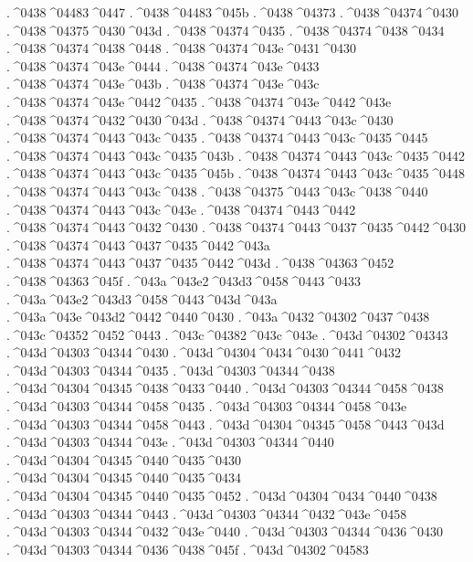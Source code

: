 {.^^^^0438^^^^04483^^^^0447
.^^^^0438^^^^04483^^^^045b
.^^^^0438^^^^04373
.^^^^0438^^^^04374^^^^0430
.^^^^0438^^^^04375^^^^0430^^^^043d
.^^^^0438^^^^04374^^^^0435
.^^^^0438^^^^04374^^^^0438^^^^0434
.^^^^0438^^^^04374^^^^0438^^^^0448
.^^^^0438^^^^04374^^^^043e^^^^0431^^^^0430
.^^^^0438^^^^04374^^^^043e^^^^0444
.^^^^0438^^^^04374^^^^043e^^^^0433
.^^^^0438^^^^04374^^^^043e^^^^043b
.^^^^0438^^^^04374^^^^043e^^^^043c
.^^^^0438^^^^04374^^^^043e^^^^0442^^^^0435
.^^^^0438^^^^04374^^^^043e^^^^0442^^^^043e
.^^^^0438^^^^04374^^^^0432^^^^0430^^^^043d
.^^^^0438^^^^04374^^^^0443^^^^043c^^^^0430
.^^^^0438^^^^04374^^^^0443^^^^043c^^^^0435
.^^^^0438^^^^04374^^^^0443^^^^043c^^^^0435^^^^0445
.^^^^0438^^^^04374^^^^0443^^^^043c^^^^0435^^^^043b
.^^^^0438^^^^04374^^^^0443^^^^043c^^^^0435^^^^0442
.^^^^0438^^^^04374^^^^0443^^^^043c^^^^0435^^^^045b
.^^^^0438^^^^04374^^^^0443^^^^043c^^^^0435^^^^0448
.^^^^0438^^^^04374^^^^0443^^^^043c^^^^0438
.^^^^0438^^^^04375^^^^0443^^^^043c^^^^0438^^^^0440
.^^^^0438^^^^04374^^^^0443^^^^043c^^^^043e
.^^^^0438^^^^04374^^^^0443^^^^0442
.^^^^0438^^^^04374^^^^0443^^^^0432^^^^0430
.^^^^0438^^^^04374^^^^0443^^^^0437^^^^0435^^^^0442^^^^0430
.^^^^0438^^^^04374^^^^0443^^^^0437^^^^0435^^^^0442^^^^043a
.^^^^0438^^^^04374^^^^0443^^^^0437^^^^0435^^^^0442^^^^043d
.^^^^0438^^^^04363^^^^0452
.^^^^0438^^^^04363^^^^045f
.^^^^043a^^^^043e2^^^^043d3^^^^0458^^^^0443^^^^0433
.^^^^043a^^^^043e2^^^^043d3^^^^0458^^^^0443^^^^043d^^^^043a
.^^^^043a^^^^043e^^^^043d2^^^^0442^^^^0440^^^^0430
.^^^^043a^^^^0432^^^^04302^^^^0437^^^^0438
.^^^^043c^^^^04352^^^^0452^^^^0443
.^^^^043c^^^^04382^^^^043c^^^^043e
.^^^^043d^^^^04302^^^^04343
.^^^^043d^^^^04303^^^^04344^^^^0430
.^^^^043d^^^^04304^^^^0434^^^^0430^^^^0441^^^^0432
.^^^^043d^^^^04303^^^^04344^^^^0435
.^^^^043d^^^^04303^^^^04344^^^^0438
.^^^^043d^^^^04304^^^^04345^^^^0438^^^^0433^^^^0440
.^^^^043d^^^^04303^^^^04344^^^^0458^^^^0438
.^^^^043d^^^^04303^^^^04344^^^^0458^^^^0435
.^^^^043d^^^^04303^^^^04344^^^^0458^^^^043e
.^^^^043d^^^^04303^^^^04344^^^^0458^^^^0443
.^^^^043d^^^^04304^^^^04345^^^^0458^^^^0443^^^^043d
.^^^^043d^^^^04303^^^^04344^^^^043e
.^^^^043d^^^^04303^^^^04344^^^^0440
.^^^^043d^^^^04304^^^^04345^^^^0440^^^^0435^^^^0430
.^^^^043d^^^^04304^^^^04345^^^^0440^^^^0435^^^^0434
.^^^^043d^^^^04304^^^^04345^^^^0440^^^^0435^^^^0452
.^^^^043d^^^^04304^^^^0434^^^^0440^^^^0438
.^^^^043d^^^^04303^^^^04344^^^^0443
.^^^^043d^^^^04303^^^^04344^^^^0432^^^^043e^^^^0458
.^^^^043d^^^^04303^^^^04344^^^^0432^^^^043e^^^^0440
.^^^^043d^^^^04303^^^^04344^^^^0436^^^^0430
.^^^^043d^^^^04303^^^^04344^^^^0436^^^^0438^^^^045f
.^^^^043d^^^^04302^^^^04583
}
